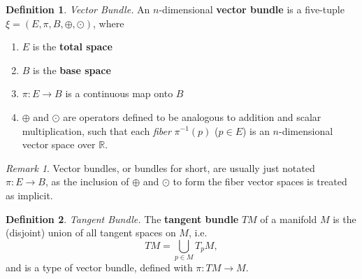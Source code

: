\documentclass[10pt,landscape]{article}
\theoremstyle{definition}
\newtheorem{definition}{Definition}[section]
\theoremstyle{remark}
\newtheorem*{remark}{Remark}
\newcommand{\R}{\mathbb{R}}
\begin{document}
\begin{multicols*}{3}
\begin{definition}{\textit{Vector Bundle.}}
An $n$-dimensional \textbf{vector bundle} is a five-tuple $\xi=(E,\pi,B,\oplus, \odot)$, where
\begin{enumerate}
    \item $E$ is the \textbf{total space}
    \item $B$ is the \textbf{base space}
    \item $\pi:E\rightarrow B$ is a continuous map onto $B$
    \item $\oplus$ and $\odot$ are operators defined to be analogous to addition and scalar multiplication, such that each \textit{fiber} $\pi^{-1}(p)$ ($p\in E$) is an $n$-dimensional vector space over $\R$.
\end{enumerate}
\end{definition}

\begin{remark}
Vector bundles, or bundles for short, are usually just notated $\pi: E\rightarrow B$, as the inclusion of $\oplus$ and $\odot$ to form the fiber vector spaces is treated as implicit.
\end{remark}

\begin{definition}{\textit{Tangent Bundle.}}
The \textbf{tangent bundle} $TM$ of a manifold $M$ is the (disjoint) union of all tangent spaces on $M$, i.e.
\begin{equation}
    TM = \bigcup_{p\in M}T_pM,
\end{equation}
and is a type of vector bundle, defined with $\pi: TM \rightarrow M$.
\end{definition}
 
\end{multicols*}
\end{document}
